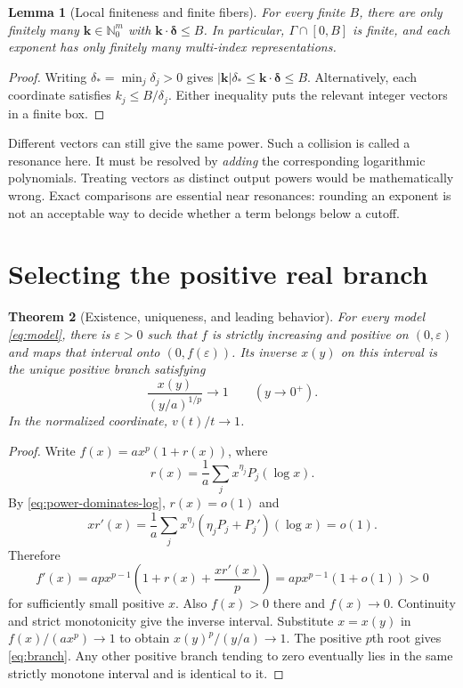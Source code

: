 \documentclass[11pt,a4paper]{article}
\numberwithin{equation}{section}
\newtheorem{theorem}{Theorem}[section]
\newtheorem{lemma}[theorem]{Lemma}
\theoremstyle{definition}
\newcommand{\N}{\mathbb N}
\newcommand{\kk}{\boldsymbol k}
\newcommand{\deltaa}{\boldsymbol\delta}
\begin{document}
\begin{lemma}[Local finiteness and finite fibers]\label{lem:finite}
For every finite $B$, there are only finitely many $\kk\in\N_0^m$
with $\kk\cdot\deltaa\le B$. In particular, $\Gamma\cap[0,B]$ is finite,
and each exponent has only finitely many multi-index representations.
\end{lemma}
\begin{proof}
Writing $\delta_* =\min_j\delta_j>0$ gives
$|\kk|\delta_*\le\kk\cdot\deltaa\le B$.
Alternatively, each coordinate satisfies $k_j\le B/\delta_j$.
Either inequality puts the relevant integer vectors in a finite box.
\end{proof}

Different vectors can still give the same power. Such a collision is
called a resonance here. It must be resolved by \emph{adding} the
corresponding logarithmic polynomials. Treating vectors as distinct output
powers would be mathematically wrong. Exact comparisons are essential
near resonances: rounding an exponent is not an acceptable way to decide
whether a term belongs below a cutoff.

\section{Selecting the positive real branch}\label{sec:branch}

\begin{theorem}[Existence, uniqueness, and leading behavior]\label{thm:branch}
For every model \eqref{eq:model}, there is $\varepsilon>0$ such that
$f$ is strictly increasing and positive on $(0,\varepsilon)$ and maps
that interval onto $(0,f(\varepsilon))$. Its inverse $x(y)$ on this
interval is the unique positive branch satisfying
\begin{equation}\label{eq:branch}
 \frac{x(y)}{(y/a)^{1/p}}\longrightarrow1\qquad(y\to0^+).
\end{equation}
In the normalized coordinate, $v(t)/t\to1$.
\end{theorem}
\begin{proof}
Write $f(x)=a x^p(1+r(x))$, where
\[
 r(x)=\frac1a\sum_jx^{\eta_j}P_j(\log x).
\]
By \eqref{eq:power-dominates-log}, $r(x)=o(1)$ and
\[
 xr'(x)=\frac1a\sum_jx^{\eta_j}
       (\eta_jP_j+P_j')(\log x)=o(1).
\]
Therefore
\begin{equation}\label{eq:derivative-leading}
 f'(x)=apx^{p-1}\left(1+r(x)+\frac{xr'(x)}p\right)
       =apx^{p-1}(1+o(1))>0
\end{equation}
for sufficiently small positive $x$. Also $f(x)>0$ there and
$f(x)\to0$. Continuity and strict monotonicity give the inverse interval.
Substitute $x=x(y)$ in $f(x)/(a x^p)\to1$ to obtain
$x(y)^p/(y/a)\to1$. The positive $p$th root gives
\eqref{eq:branch}. Any other positive branch tending to zero eventually
lies in the same strictly monotone interval and is identical to it.
\end{proof}
\end{document}
